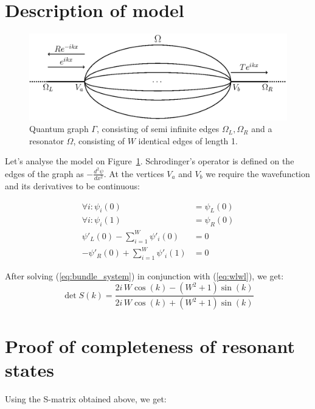 \documentclass{gCOV2e}
\theoremstyle{plain}%
\theoremstyle{definition}
\theoremstyle{remark}
\begin{document}
\section{Description of model}

\begin{figure}[htbp]
\begin{center}
\includegraphics[trim=0 670 155 0,clip,width=\textwidth]{resonator_bundle.eps}
\caption{Quantum graph $\Gamma$, consisting of semi infinite edges $\Omega_L, \Omega_R$ 
and a resonator $\Omega$, consisting of $W$ identical edges of length 1.}
\label{fig:res_bundle}
\end{center}
\end{figure}


Let's analyse the model on Figure~\ref{fig:res_bundle}. Schrodinger's operator is defined on the edges of the graph as  $-\frac{d^2 \psi}{dx^2}$. At the vertices $V_a$ and $V_b$ we require the wavefunction and its derivatives to be continuous:

\begin{equation}\label{eq:bundle_system}
\begin{aligned}
   \forall i: \psi_i(0) &= \psi_L(0)
\\ \forall i: \psi_i(1) &= \psi_R(0)
\\ \psi'_L(0) - \sum\limits_{i = 1}^W \psi'_i(0) &= 0
\\ -\psi'_R(0) + \sum\limits_{i = 1}^W \psi'_i(1) &= 0
\end{aligned}
\end{equation}

After solving (\ref{eq:bundle_system}) in conjunction with (\ref{eq:wlwl}), we get:
\begin{equation*}
\det S(k) = \frac{2 i \, W \cos\left(k\right) - {\left(W^{2} + 1\right)} \sin\left(k\right)}{2 i \, W \cos\left(k\right) + {\left(W^{2} + 1\right)} \sin\left(k\right)}
\end{equation*}

\section{Proof of completeness of resonant states}
Using the S-matrix obtained above, we get:
\end{document}
